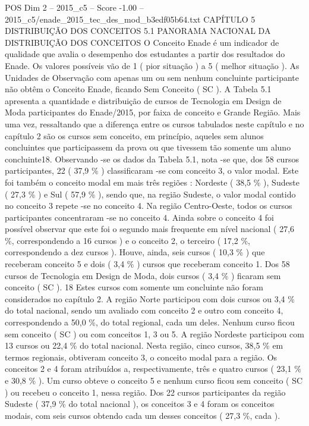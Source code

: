 \begin{textsample}{POS Dim 2 – 2015\_c5 – Score -1.00 – 2015\_c5/enade\_2015\_tec\_des\_mod\_b3edf05b64.txt}  \label{ex:f2_pos_281}
CAPÍTULO 5 DISTRIBUIÇÃO DOS CONCEITOS 5.1 PANORAMA NACIONAL DA DISTRIBUIÇÃO DOS CONCEITOS O Conceito Enade é um indicador de qualidade que avalia o desempenho dos estudantes a partir dos resultados do Enade.
Os valores possíveis vão de 1 ( pior situação ) a 5 ( melhor situação ).
As Unidades de Observação com apenas um ou sem nenhum concluinte participante não obtêm o Conceito Enade, ficando Sem Conceito ( SC ).
A Tabela 5.1 apresenta a quantidade e distribuição de cursos de Tecnologia em Design de Moda participantes do Enade/2015, por faixa de conceito e Grande Região.
Mais uma vez, ressaltando que a diferença entre os cursos tabulados neste capítulo e no capítulo 2 são os cursos sem conceito, em princípio, aqueles sem alunos concluintes que participassem da prova ou que tivessem tão somente um aluno concluinte18.
Observando -se os dados da Tabela 5.1, nota -se que, dos 58 cursos participantes, 22 ( 37,9 \% ) classificaram -se com conceito 3, o valor modal.
Este foi também o conceito modal em mais três regiões : Nordeste ( 38,5 \% ), Sudeste ( 27,3 \% ) e Sul ( 57,9 \% ), sendo que, na região Sudeste, o valor modal contido no conceito 3 repete -se no conceito 4.
Na região Centro-Oeste, todos os cursos participantes concentraram -se no conceito 4.
Ainda sobre o conceito 4 foi possível observar que este foi o segundo mais frequente em nível nacional ( 27,6 \%, correspondendo a 16 cursos ) e o conceito 2, o terceiro ( 17,2 \%, correspondendo a dez cursos ).
Houve, ainda, seis cursos ( 10,3 \% ) que receberam conceito 5 e dois ( 3,4 \% ) cursos que receberam conceito 1.
Dos 58 cursos de Tecnologia em Design de Moda, dois cursos ( 3,4 \% ) ficaram sem conceito ( SC ). 18 Estes cursos com somente um concluinte não foram considerados no capítulo 2.
A região Norte participou com dois cursos ou 3,4 \% do total nacional, sendo um avaliado com conceito 2 e outro com conceito 4, correspondendo a 50,0 \%, do total regional, cada um deles.
Nenhum curso ficou sem conceito ( SC ) ou com conceitos 1, 3 ou 5.
A região Nordeste participou com 13 cursos ou 22,4 \% do total nacional.
Nesta região, cinco cursos, 38,5 \% em termos regionais, obtiveram conceito 3, o conceito modal para a região.
Os conceitos 2 e 4 foram atribuídos a, respectivamente, três e quatro cursos ( 23,1 \% e 30,8 \% ).
Um curso obteve o conceito 5 e nenhum curso ficou sem conceito ( SC ) ou recebeu o conceito 1, nessa região.
Dos 22 cursos participantes da região Sudeste ( 37,9 \% do total nacional ), os conceitos 3 e 4 foram os conceitos modais, com seis cursos obtendo cada um desses conceitos ( 27,3 \%, cada ).

\end{textsample}
